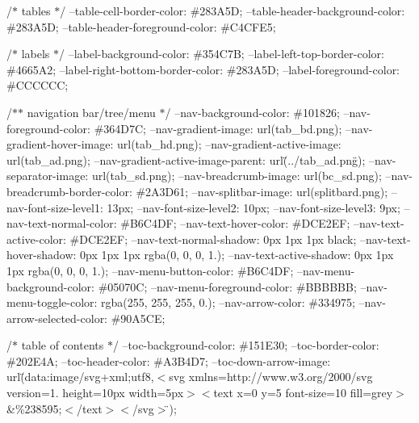 /\texorpdfstring{$\ast$}{*} tables \texorpdfstring{$\ast$}{*}/ --table-\/cell-\/border-\/color\+: \#283A5D; --table-\/header-\/background-\/color\+: \#283A5D; --table-\/header-\/foreground-\/color\+: \#\+C4\+CFE5;

/\texorpdfstring{$\ast$}{*} labels \texorpdfstring{$\ast$}{*}/ --label-\/background-\/color\+: \#354C7B; --label-\/left-\/top-\/border-\/color\+: \#4665A2; --label-\/right-\/bottom-\/border-\/color\+: \#283A5D; --label-\/foreground-\/color\+: \#\+CCCCCC;

/\texorpdfstring{$\ast$}{*}\texorpdfstring{$\ast$}{*} navigation bar/tree/menu \texorpdfstring{$\ast$}{*}/ --nav-\/background-\/color\+: \#101826; --nav-\/foreground-\/color\+: \#364D7C; --nav-\/gradient-\/image\+: url(\textquotesingle{}tab\+\_\+bd.\+png\textquotesingle{}); --nav-\/gradient-\/hover-\/image\+: url(\textquotesingle{}tab\+\_\+hd.\+png\textquotesingle{}); --nav-\/gradient-\/active-\/image\+: url(\textquotesingle{}tab\+\_\+ad.\+png\textquotesingle{}); --nav-\/gradient-\/active-\/image-\/parent\+: url(\"{}../tab\+\_\+ad.\+png\"{}); --nav-\/separator-\/image\+: url(\textquotesingle{}tab\+\_\+sd.\+png\textquotesingle{}); --nav-\/breadcrumb-\/image\+: url(\textquotesingle{}bc\+\_\+sd.\+png\textquotesingle{}); --nav-\/breadcrumb-\/border-\/color\+: \#2A3\+D61; --nav-\/splitbar-\/image\+: url(\textquotesingle{}splitbard.\+png\textquotesingle{}); --nav-\/font-\/size-\/level1\+: 13px; --nav-\/font-\/size-\/level2\+: 10px; --nav-\/font-\/size-\/level3\+: 9px; --nav-\/text-\/normal-\/color\+: \#\+B6\+C4\+DF; --nav-\/text-\/hover-\/color\+: \#\+DCE2\+EF; --nav-\/text-\/active-\/color\+: \#\+DCE2\+EF; --nav-\/text-\/normal-\/shadow\+: 0px 1px 1px black; --nav-\/text-\/hover-\/shadow\+: 0px 1px 1px rgba(0, 0, 0, 1.); --nav-\/text-\/active-\/shadow\+: 0px 1px 1px rgba(0, 0, 0, 1.); --nav-\/menu-\/button-\/color\+: \#\+B6\+C4\+DF; --nav-\/menu-\/background-\/color\+: \#05070C; --nav-\/menu-\/foreground-\/color\+: \#\+BBBBBB; --nav-\/menu-\/toggle-\/color\+: rgba(255, 255, 255, 0.); --nav-\/arrow-\/color\+: \#334975; --nav-\/arrow-\/selected-\/color\+: \#90A5\+CE;

/\texorpdfstring{$\ast$}{*} table of contents \texorpdfstring{$\ast$}{*}/ --toc-\/background-\/color\+: \#151E30; --toc-\/border-\/color\+: \#202E4A; --toc-\/header-\/color\+: \#\+A3\+B4\+D7; --toc-\/down-\/arrow-\/image\+: url(\"{}data\+:image/svg+xml;utf8,$<$svg xmlns=\textquotesingle{}http\+://www.\+w3.\+org/2000/svg\textquotesingle{} version=\textquotesingle{}1.\textquotesingle{} height=\textquotesingle{}10px\textquotesingle{} width=\textquotesingle{}5px\textquotesingle{}$>$$<$text x=\textquotesingle{}0\textquotesingle{} y=\textquotesingle{}5\textquotesingle{} font-\/size=\textquotesingle{}10\textquotesingle{} fill=\textquotesingle{}grey\textquotesingle{}$>$\&\%238595;$<$/text$>$$<$/svg$>$\"{});

